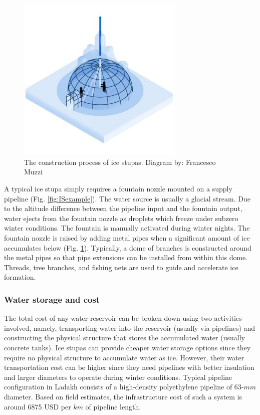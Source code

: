 \begin{figure}[htb]
	\centering
	\includegraphics[width=8cm]{figs/IS_science.jpg}
	\caption{The construction process of ice stupas. Diagram by: Francesco Muzzi }
	\label{fig:ISconstruction}
\end{figure}

A typical ice stupa simply requires a fountain nozzle mounted on a supply pipeline (Fig. \ref{fig:ISexample}).
The water source is usually a glacial stream. Due to the altitude difference between the pipeline input and the
fountain output, water ejects from the fountain nozzle as droplets which freeze under subzero winter conditions.
The fountain is manually activated during winter nights. The fountain nozzle is raised by adding
metal pipes when a significant amount of ice accumulates below (Fig. \ref{fig:ISconstruction}). Typically, a dome of
branches is constructed around the metal pipes so that pipe extensions can be installed from within this dome.
Threads, tree branches, and fishing nets are used to guide and accelerate ice formation.

\subsubsection{Water storage and cost}
\label{sec:icestupa_irr}

The total cost of any water reservoir can be broken down using two activities involved, namely, transporting water into the reservoir (usually via pipelines) and constructing the physical structure that stores the accumulated water (usually concrete tanks). Ice stupas can provide cheaper water storage options since they require no physical structure to accumulate water as ice. However, their water transportation cost can be higher since they need pipelines with better insulation and larger diameters to operate during winter conditions. Typical pipeline configuration in Ladakh consists of a high-density polyethylene pipeline of 63-$mm$ diameter. Based on field estimates, the infrastructure cost of such a
system is around 6875 USD per $km$ of pipeline length.


